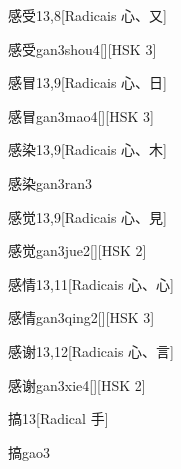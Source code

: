\begin{entry}{感受}{13,8}[Radicais ⼼、⼜]
  \begin{phonetics}{感受}{gan3shou4}[][HSK 3]
  \end{phonetics}
\end{entry}

\begin{entry}{感冒}{13,9}[Radicais ⼼、⽇]
  \begin{phonetics}{感冒}{gan3mao4}[][HSK 3]
  \end{phonetics}
\end{entry}

\begin{entry}{感染}{13,9}[Radicais ⼼、⽊]
  \begin{phonetics}{感染}{gan3ran3}
  \end{phonetics}
\end{entry}

\begin{entry}{感觉}{13,9}[Radicais ⼼、⾒]
  \begin{phonetics}{感觉}{gan3jue2}[][HSK 2]
  \end{phonetics}
\end{entry}

\begin{entry}{感情}{13,11}[Radicais ⼼、⼼]
  \begin{phonetics}{感情}{gan3qing2}[][HSK 3]
  \end{phonetics}
\end{entry}

\begin{entry}{感谢}{13,12}[Radicais ⼼、⾔]
  \begin{phonetics}{感谢}{gan3xie4}[][HSK 2]
  \end{phonetics}
\end{entry}

\begin{entry}{搞}{13}[Radical ⼿]
  \begin{phonetics}{搞}{gao3}
  \end{phonetics}
\end{entry}

